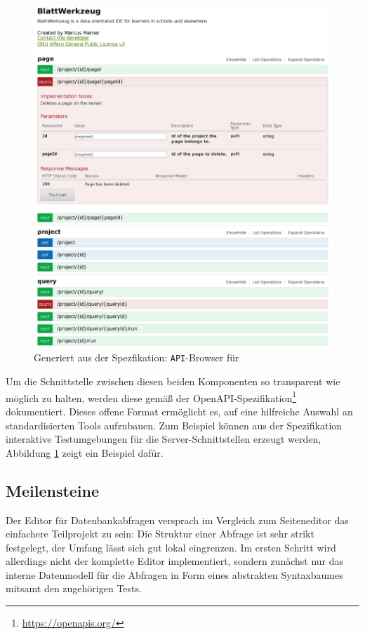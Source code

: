 \begin{figure}[p]
  \centering \includegraphics[width=\textwidth]{images/openapi-query-example.png}
  \caption{Generiert aus der Spezfikation: \texttt{API}-Browser für \idename{}}
  \label{fig:openapi-query-example}
\end{figure}

Um die Schnittstelle zwischen diesen beiden Komponenten so transparent wie möglich zu halten, werden diese gemäß der OpenAPI-Spezifikation\footnote{\url{https://openapis.org/}} dokumentiert. Dieses offene Format ermöglicht es, auf eine hilfreiche Auswahl an standardisierten Tools aufzubauen. Zum Beispiel können aus der Spezifikation interaktive Testumgebungen für die Server-Schnittstellen erzeugt werden, Abbildung \ref{fig:openapi-query-example} zeigt ein Beispiel dafür.

\subsection{Meilensteine}
\label{sec:implementation-roadmap}

Der Editor für Datenbankabfragen versprach im Vergleich zum Seiteneditor das einfachere Teilprojekt zu sein: Die Struktur einer Abfrage ist sehr strikt festgelegt, der Umfang lässt sich gut lokal eingrenzen. Im ersten Schritt wird allerdings nicht der komplette Editor implementiert, sondern zunächst nur das interne Datenmodell für die Abfragen in Form eines abstrakten Syntaxbaumes mitsamt den zugehörigen Tests.

